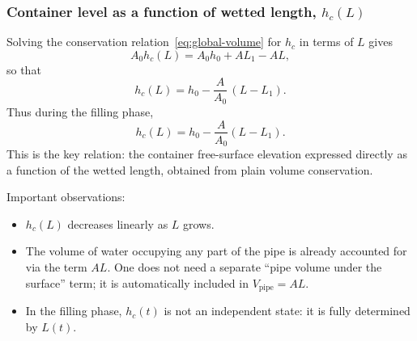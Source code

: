 \documentclass[11pt]{article}
\begin{document}
\subsubsection{Container level as a function of wetted length, $h_c(L)$}

Solving the conservation relation~\eqref{eq:global-volume} for $h_c$ in terms of $L$ gives
\[
  A_0 h_c(L) = A_0 h_0 + A L_1 - A L,
\]
so that
\[
  h_c(L) = h_0 - \frac{A}{A_0}\,(L - L_1).
\]
Thus during the filling phase,
\begin{equation}
  h_c(L) = h_0 - \frac{A}{A_0}(L - L_1).
  \label{eq:hc-of-L}
\end{equation}
This is the key relation: the container free-surface elevation expressed directly as a function
of the wetted length, obtained from plain volume conservation.

Important observations:
\begin{itemize}
  \item $h_c(L)$ decreases linearly as $L$ grows.
  \item The volume of water occupying any part of the pipe is already accounted for via the
        term $A L$. One does not need a separate ``pipe volume under the surface'' term;
        it is automatically included in $V_{\text{pipe}} = A L$.
  \item In the filling phase, $h_c(t)$ is not an independent state: it is fully determined by
        $L(t)$.
\end{itemize}
\end{document}
